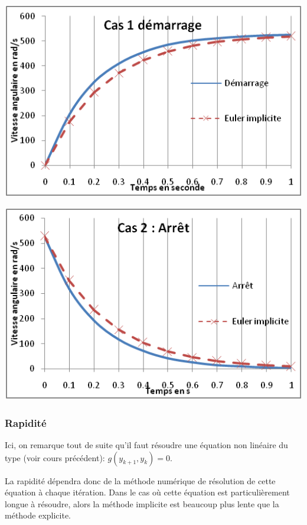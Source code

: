 \documentclass[10pt,fleqn]{article} %
\begin{document}
\begin{minipage}[c]{.47\linewidth}
\begin{center}
\includegraphics[width=.95\textwidth]{images/fig_09}
\end{center}
\end{minipage}
\hfill
\begin{minipage}[c]{.47\linewidth}
\begin{center}
\includegraphics[width=.95\textwidth]{images/fig_10}
\end{center}
\end{minipage}

\subsubsection{Rapidité}

Ici, on remarque tout de suite qu’il faut résoudre une équation non linéaire du type (voir cours précédent):
$g(y_{k+1},y_k)=0$.

La rapidité dépendra donc de la méthode numérique de résolution de cette équation à chaque itération. Dans le cas où cette équation est particulièrement longue à résoudre, alors la méthode implicite est beaucoup plus lente que la méthode explicite.
\end{document}
